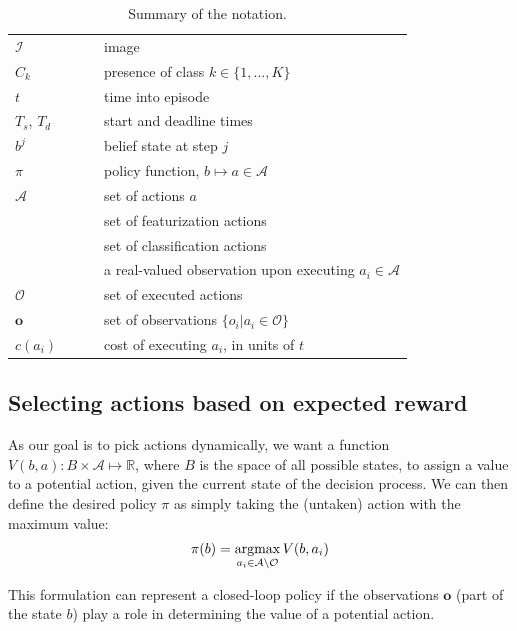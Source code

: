 \begin{table}[h!]
\centering
\caption{Summary of the notation.}
\label{tab:notation}
\begin{tabular}{|l|l|}
  \hline
  $\mathcal{I}$ & image \\
  $C_k$         & presence of class $k \in \{1,\dots,K\}$ \\ 
  $t$           & time into episode \\ 
  $T_s$, $T_d$  & start and deadline times \\ 
  $b^j$         & belief state at step $j$ \\ 
  $\pi$         & policy function, $b \mapsto a \in \mathcal{A}$ \\
  $\mathcal{A}$ & set of actions $a$\\ 
  \comment{$\mathcal{F}$ & set of featurization actions \\}
  \comment{$\mathcal{L}$ & set of classification actions\\}
  $o_i$         & a real-valued observation upon executing $a_i \in \mathcal{A}$\\
  $\mathcal{O}$ & set of executed actions\\
  $\mathbf{o}$  & set of observations $\{o_i | a_i \in \mathcal{O}\}$\\
  $c(a_i)$        & cost of executing $a_i$, in units of $t$\\
  \hline
\end{tabular}\end{table}

\subsection{Selecting actions based on expected reward} \label{sec:value}
As our goal is to pick actions dynamically, we want a function $V(b,a): B \times \mathcal{A} \mapsto \mathbb{R}$, where $B$ is the space of all possible states, to assign a value to a potential action, given the current state of the decision process.
We can then define the desired policy $\pi$ as simply taking the (untaken) action with the maximum value:
\begin{align}
\pi(b) = \argmax_{a_i \in \mathcal{A} \setminus \mathcal{O}} V(b,a_i)
\end{align}

This formulation can represent a closed-loop policy if the observations $\mathbf{o}$ (part of the state $b$) play a role in determining the value of a potential action.

